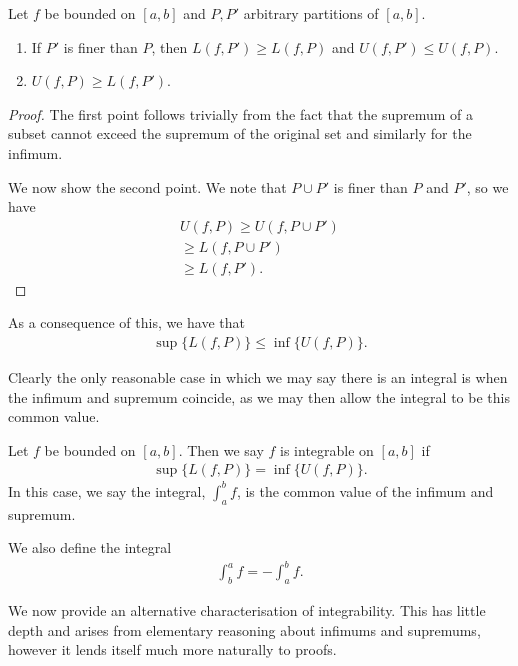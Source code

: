 \documentclass[]{article}
\begin{document}
\begin{thm}
		Let $f$ be bounded on $[a,b]$ and $P, P'$ arbitrary partitions of $[a,b]$.
	\begin{enumerate}
			\item If $P'$ is finer than $P$, then $L(f, P') \geq L(f,P)$ and $U(f,P') \leq U(f,P)$.	
			\item $U(f,P) \geq L(f,P')$.
	\end{enumerate}	
\end{thm}

\begin{proof}
		The first point follows trivially from the fact that the supremum of a subset cannot exceed the supremum of the original set and similarly for the infimum.

		We now show the second point. We note that $P \cup P'$ is finer than $P$ and $P'$, so we have
		\begin{align*}
				U(f,P) \geq U(f, P \cup P') \\
				\geq L(f, P \cup P') \\
				\geq L(f, P').
		\end{align*}
\end{proof}

As a consequence of this, we have that
\begin{align*}
		\sup \{L(f,P)\} \leq \inf \{U(f,P)\}.
\end{align*}

Clearly the only reasonable case in which we may say there is an integral is when the infimum and supremum coincide, as we may then allow the integral to be this common value.

\begin{defi} [Integral]
		Let $f$ be bounded on $[a,b]$. Then we say $f$ is integrable on $[a,b]$ if 
		\begin{align*}
			\sup \{L(f,P)\} = \inf \{U(f,P)\}.
		\end{align*}
		In this case, we say the integral, $\int_a^bf$, is the common value of the infimum and supremum.

		We also define the integral 
		\begin{align*}
				\int_b^af = -\int_a^bf.
		\end{align*}
\end{defi}

We now provide an alternative characterisation of integrability. This has little depth and arises from elementary reasoning about infimums and supremums, however it lends itself much more naturally to proofs. 
\end{document}
